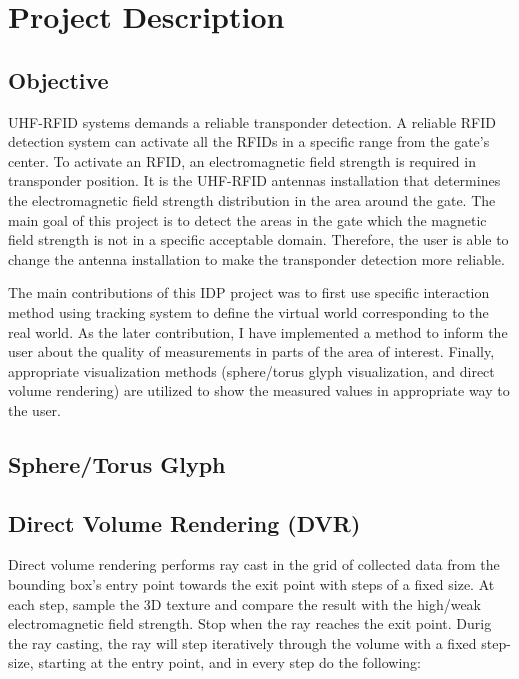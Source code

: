 \chapter{Project Description}
\section{Objective}

UHF-RFID systems demands a reliable transponder detection. A reliable RFID detection system can activate all the RFIDs in a specific range from the gate's center. To activate an RFID, an electromagnetic field strength is required in transponder position. It is the UHF-RFID antennas installation that determines the electromagnetic field strength distribution in the area around the gate. The main goal of this project is to detect the areas in the gate which the magnetic field strength is not in a specific acceptable domain. Therefore, the user is able to change the antenna installation to make the transponder detection more reliable.

The main contributions of this IDP project was to first use specific interaction method using tracking system to define the virtual world corresponding to the real world. As the later contribution, I have implemented a method to inform the user about the quality of measurements in parts of the area of interest. Finally, appropriate visualization methods (sphere/torus glyph visualization, and direct volume rendering) are utilized to show the measured values in appropriate way to the user.

\section{Sphere/Torus Glyph}

\section{Direct Volume Rendering (DVR)}

Direct volume rendering performs ray cast in the grid of collected data from the
bounding box's entry point towards the exit point with steps of a fixed size. At each step, sample the
3D texture and compare the result with the high/weak electromagnetic field strength. Stop when the ray reaches the exit point. Durig the ray casting, the ray will step iteratively through the volume with a fixed step-size, starting at the entry point, and in every step do the following:


